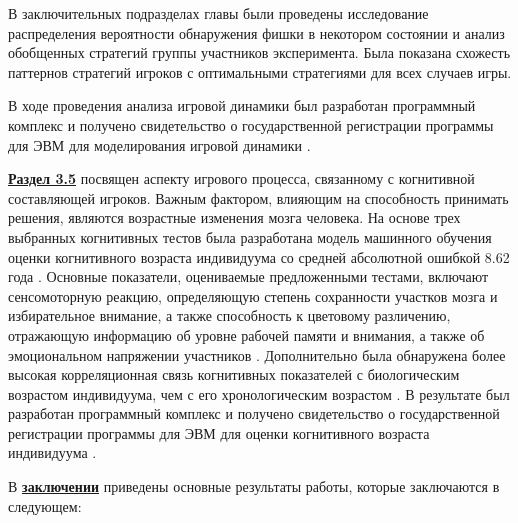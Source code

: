 В заключительных подразделах главы были проведены исследование распределения вероятности обнаружения фишки в некотором состоянии и анализ обобщенных стратегий группы участников эксперимента. Была показана схожесть паттернов стратегий игроков с оптимальными стратегиями для всех случаев игры.

В ходе проведения анализа игровой динамики был разработан программный комплекс и получено свидетельство о государственной регистрации программы для ЭВМ для моделирования игровой динамики \cite{progbib1}.

\underline{\textbf{Раздел 3.5}} посвящен аспекту игрового процесса, связанному с когнитивной составляющей игроков. Важным фактором, влияющим на способность принимать решения, являются возрастные изменения мозга человека. На основе трех выбранных когнитивных тестов была разработана модель машинного обучения оценки когнитивного возраста индивидуума со средней абсолютной ошибкой 8.62 года \cite{bib4}. Основные показатели, оцениваемые предложенными тестами, включают сенсомоторную реакцию, определяющую степень сохранности участков мозга и избирательное внимание, а также способность к цветовому различению, отражающую информацию об уровне рабочей памяти и внимания, а также об эмоциональном напряжении участников \cite{confbib2}. Дополнительно была обнаружена более высокая корреляционная связь когнитивных показателей с биологическим возрастом индивидуума, чем с его хронологическим возрастом \cite{confbib3}. В результате был разработан программный комплекс и получено свидетельство о государственной регистрации программы для ЭВМ для оценки когнитивного возраста индивидуума \cite{progbib2}.


\FloatBarrier
{}                                  %
В \underline{\textbf{заключении}} приведены основные результаты работы, которые заключаются в следующем:




